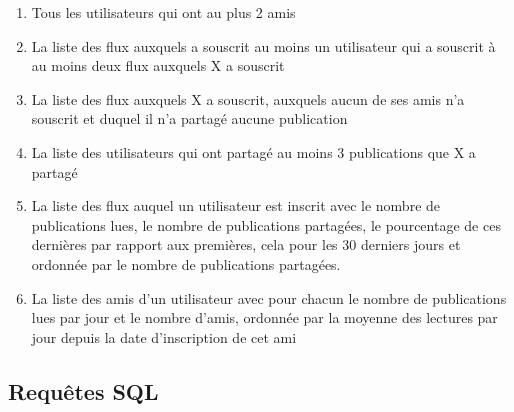 \documentclass[a4paper,10pt]{article}
\begin{document}
	\begin{enumerate}
	    \item Tous les utilisateurs qui ont au plus 2 amis
	    \item La liste des flux auxquels a souscrit au moins un utilisateur qui a souscrit à au moins deux flux auxquels X a souscrit
	    \item La liste des flux auxquels X a souscrit, auxquels aucun de ses amis n’a souscrit et duquel il n’a partagé aucune publication
	    \item La liste des utilisateurs qui ont partagé au moins 3 publications que X a partagé
	    \item La liste des flux auquel un utilisateur est inscrit avec le nombre de publications lues, le nombre de publications partagées, le pourcentage de ces dernières par rapport aux premières, cela pour les 30 derniers jours et ordonnée par le nombre de publications partagées.
	    \item La liste des amis d’un utilisateur avec pour chacun le nombre de publications lues par jour et le nombre d’amis, ordonnée par la moyenne des lectures par jour depuis la date d’inscription de cet ami
	\end{enumerate}
	
\subsection{Requêtes SQL}
\end{document}
